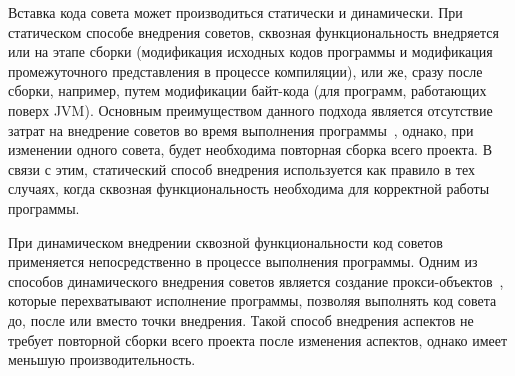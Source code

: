 \documentclass[conference]{IEEEtran}
\begin{document}


Вставка кода совета может производиться статически и динамически.
При статическом способе внедрения советов, сквозная функциональность внедряется
или на этапе сборки (модификация исходных кодов программы и модификация
промежуточного представления в процессе компиляции), или же, сразу после сборки, 
например, путем модификации байт-кода (для программ, работающих поверх JVM).
Основным преимуществом данного подхода является отсутствие затрат на внедрение
советов во время выполнения программы~\cite{static_and_dynamic_weaving}, однако,
при изменении одного совета, будет необходима повторная сборка всего проекта.
В связи с этим, статический способ внедрения используется как правило в тех
случаях, когда сквозная функциональность необходима для корректной работы
программы.

При динамическом внедрении сквозной функциональности код советов применяется
непосредственно в процессе выполнения программы.
Одним из способов динамического внедрения советов является создание 
прокси-объектов~\cite{aspect_dynamic_weavers}, которые перехватывают
исполнение программы, позволяя выполнять код совета до, после или вместо точки
внедрения.
Такой способ внедрения аспектов не требует повторной сборки всего проекта после
изменения аспектов, однако имеет меньшую производительность.
\end{document}
